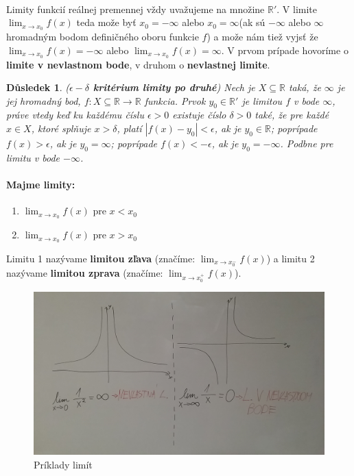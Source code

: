 \documentclass[12pt,a4paper]{article}
\newtheorem{result}{Důsledek}
\begin{document}
\paragraph{}
Limity funkcií reálnej premennej vždy uvažujeme na množine $\mathds{R}'$. V limite $\lim_{x \to x_{0}} f(x)$ teda može byť $x_{0}=-\infty $ alebo $ x_{0}=\infty$(ak sú $-\infty$ alebo $\infty$ hromadným bodom definičného oboru funkcie $f$) a može nám tiež vyjsť že $\lim_{x \to x_{0}} f(x) = -\infty$ alebo $\lim_{x \to x_{0}} f(x) = \infty$. V prvom prípade hovoríme o \textbf{limite v nevlastnom bode}, v druhom o \textbf{nevlastnej limite}.

\begin{result}
	(\textbf{$\epsilon -\delta$ kritérium limity po druhé}) Nech je $X \subseteq \mathds{R}$ taká, že $\infty$ je jej hromadný bod, $f: X \subseteq \mathds{R} \rightarrow \mathds{R}$ funkcia. Prvok $y_{0} \in \mathds{R}'$ je limitou $f$ v bode $\infty$, práve vtedy keď ku každému číslu $\epsilon>0$ existuje číslo $\delta>0$ také, že pre každé $x \in X$, ktoré splňuje $x>\delta$, platí $|f(x)-y_{0}|<\epsilon$, ak je $y_{0}\in \mathds{R}$; poprípade $f(x)>\epsilon$, ak je $y_{0}=\infty$; poprípade $f(x)<-\epsilon$, ak je $y_{0}=-\infty$. Podbne pre limitu v bode $-\infty$.
\end{result}
\vspace{-0.8cm}
\paragraph{\textbf{Majme limity:}}

\begin{enumerate}
	\item $\lim_{x \to x_{0}} f(x)$ pre $x<x_{0}$
	\item $\lim_{x \to x_{0}} f(x)$ pre $x>x_{0}$
\end{enumerate}

Limitu 1 nazývame \textbf{limitou zľava} (značíme: $\lim_{x \to x_{0}^{-}} f(x)$) a limitu 2 nazývame \textbf{limitou zprava} (značíme: $\lim_{x \to x_{0}^{+}} f(x)$).

\begin{figure}[ht]
	\begin{center}
		\includegraphics[scale=0.148]{img/limits}
	\end{center}
	\caption{Príklady limít}
\end{figure}
\end{document}
